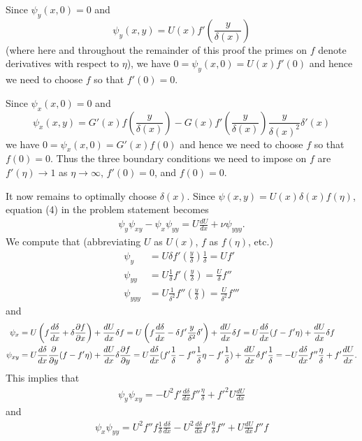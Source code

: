 Since $\psi_{y}(x, 0) = 0$ and $$\psi_{y}(x, y) = U(x)f'(\frac{y}{\delta(x)})$$ (where here and
throughout the remainder of this proof the primes on $f$ denote derivatives with respect to $\eta$), we have
$0 = \psi_{y}(x, 0) = U(x)f'(0)$
and hence we need to choose $f$ so that $f'(0) = 0$.

Since $\psi_{x}(x, 0) = 0$ and
$$\psi_{x}(x, y) = G'(x)f(\frac{y}{\delta(x)}) - G(x)f'(\frac{y}{\delta(x)})\frac{y}{\delta(x)^{2}}\delta'(x)$$
we have
$0 = \psi_{x}(x, 0) = G'(x)f(0)$
and hence we need to choose $f$ so that $f(0) = 0$.
Thus the three boundary conditions we need to impose on $f$ are $f'(\eta) \rightarrow 1$ as $\eta \rightarrow \infty$, $f'(0) = 0$, and $f(0) = 0$.

It now remains to optimally choose $\delta(x)$. Since $\psi(x, y) = U(x)\delta(x)f(\eta)$,
equation (4) in the problem statement becomes
\begin{align}\label{F14Q6psieq}
\psi_{y}\psi_{xy} - \psi_{x}\psi_{yy} = U\frac{dU}{dx} + \nu\psi_{yyy}.
\end{align}
We compute that (abbreviating $U$ as $U(x)$, $f$ as $f(\eta)$, etc.)
\begin{align*}
\psi_{y} &= U\delta f'(\frac{y}{\delta})\frac{1}{\delta} = Uf'\\
\psi_{yy} &= U\frac{1}{\delta}f'(\frac{y}{\delta}) = \frac{U}{\delta}f''\\
\psi_{yyy} &= U\frac{1}{\delta^{2}}f''(\frac{y}{\delta}) = \frac{U}{\delta^{2}}f'''
\end{align*}
and
\small
\begin{align*}
\psi_{x} &= U\left(f\frac{d\delta}{dx} + \delta \frac{\partial f}{\partial x}\right) + \frac{dU}{dx}\delta f= U\left(f\frac{d\delta}{dx} - \delta f'\frac{y}{\delta^{2}}\delta'\right) + \frac{dU}{dx}\delta f = U\frac{d\delta}{dx}(f - f'\eta) + \frac{dU}{dx}\delta f\\
\psi_{xy} &= U\frac{d\delta}{dx}\frac{\partial}{\partial y}(f - f'\eta) + \frac{dU}{dx}\delta\frac{\partial f}{\partial y}= U\frac{d\delta}{dx}(f'\frac{1}{\delta} - f''\frac{1}{\delta}\eta - f'\frac{1}{\delta}) + \frac{dU}{dx}\delta f'\frac{1}{\delta} = -U\frac{d\delta}{dx}f''\frac{\eta}{\delta} + f'\frac{dU}{dx}.
\end{align*}
\normalsize
This implies that
\begin{align*}
\psi_{y}\psi_{xy} = -U^{2}f'\frac{d\delta}{dx}f''\frac{\eta}{\delta} + f'^{2}U\frac{dU}{dx}
\end{align*}
and
\begin{align*}
\psi_{x}\psi_{yy} = U^{2}f''f\frac{1}{\delta}\frac{d\delta}{dx} - U^{2}\frac{d\delta}{dx}f'\frac{\eta}{\delta}f'' + U\frac{dU}{dx}f''f
\end{align*}
